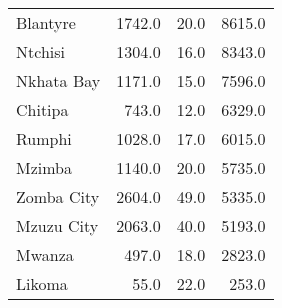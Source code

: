 \begin{tabular}{lrrr}
Blantyre      &      1742.0 &         20.0 &           8615.0 \\
Ntchisi       &      1304.0 &         16.0 &           8343.0 \\
Nkhata Bay    &      1171.0 &         15.0 &           7596.0 \\
Chitipa       &       743.0 &         12.0 &           6329.0 \\
Rumphi        &      1028.0 &         17.0 &           6015.0 \\
Mzimba        &      1140.0 &         20.0 &           5735.0 \\
Zomba City    &      2604.0 &         49.0 &           5335.0 \\
Mzuzu City    &      2063.0 &         40.0 &           5193.0 \\
Mwanza        &       497.0 &         18.0 &           2823.0 \\
Likoma        &        55.0 &         22.0 &            253.0 \\
\bottomrule
\end{tabular}
